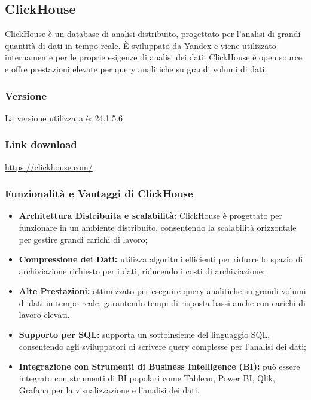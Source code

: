 \subsection{ClickHouse}
ClickHouse è un database di analisi distribuito, progettato per l'analisi di grandi quantità di dati in tempo reale. È sviluppato da Yandex e viene utilizzato internamente per le proprie esigenze di analisi dei dati. ClickHouse è open source e offre prestazioni elevate per query analitiche su grandi volumi di dati.
\subsubsection{Versione}
La versione utilizzata è: 24.1.5.6
\subsubsection{Link download}
\href{https://clickhouse.com/}{https://clickhouse.com/}

\subsubsection*{Funzionalità e Vantaggi di ClickHouse}
\begin{itemize}
    \item \textbf{Architettura Distribuita e scalabilità:} ClickHouse è progettato per funzionare in un ambiente distribuito, consentendo la scalabilità orizzontale per gestire grandi carichi di lavoro;
    \item \textbf{Compressione dei Dati:} utilizza algoritmi efficienti per ridurre lo spazio di archiviazione richiesto per i dati, riducendo i costi di archiviazione;
    \item \textbf{Alte Prestazioni:} ottimizzato per eseguire query analitiche su grandi volumi di dati in tempo reale, garantendo tempi di risposta bassi anche con carichi di lavoro elevati.
    \item \textbf{Supporto per SQL:} supporta un sottoinsieme del linguaggio SQL, consentendo agli sviluppatori di scrivere query complesse per l'analisi dei dati;
    \item \textbf{Integrazione con Strumenti di Business Intelligence (BI):} può essere integrato con strumenti di BI popolari come Tableau, Power BI, Qlik, Grafana per la visualizzazione e l'analisi dei dati.
\end{itemize}



